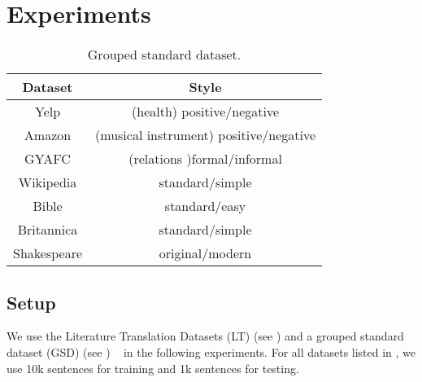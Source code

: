 \section{Experiments}
\label{sec:eval}
%

\begin{table}[th]\footnotesize
	\centering
	\begin{tabular}{cc}
		\hline
		\textbf{Dataset} & \textbf{Style} \\
		\hline
		Yelp & (health) positive/negative \\
		Amazon & (musical instrument) positive/negative \\
		GYAFC & (relations )formal/informal \\
		Wikipedia & standard/simple \\
		Bible & standard/easy \\
		Britannica & standard/simple \\
		Shakespeare & original/modern \\
		\hline
	\end{tabular}
	\caption{Grouped standard dataset.}\label{tb:data2}
\end{table}


\subsection{Setup}
We use the Literature Translation Datasets (LT) (see ) 
and a grouped standard dataset (GSD) (see ) 
~\citep{li2018delete,Sudhakar2020,rao-tetreault-2018-dear} in the following
experiments. For all datasets listed in , we use 10k sentences for training and 1k sentences for testing.


